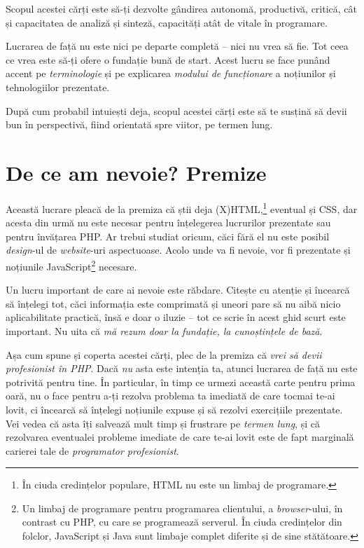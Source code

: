 Scopul acestei cărți este să-ți dezvolte gândirea autonomă, productivă,
critică, cât și capacitatea de analiză și sinteză, capacități atât de vitale
în programare.

Lucrarea de față nu este nici pe departe completă -- nici nu vrea să fie.
Tot ceea ce vrea este să-ți ofere o fundație bună de start. Acest lucru se 
face punând accent pe \textit{terminologie} și pe explicarea
\textit{modului de funcționare} a noțiunilor și tehnologiilor prezentate.

După cum probabil intuiești deja, scopul acestei cărți este să
te susțină să devii bun în perspectivă, fiind orientată spre
viitor, pe termen lung.

{}
\section*{De ce am nevoie? Premize}
Această lucrare pleacă de la premiza că știi deja (X)HTML,\footnote{În
ciuda credințelor populare, HTML nu este un limbaj de programare.} eventual și CSS, dar
acesta din urmă nu este necesar pentru înțelegerea lucrurilor prezentate
sau pentru învățarea PHP. Ar trebui
studiat oricum, căci fără el nu este posibil \textsl{design}-ul de
\textsl{website}-uri aspectuoase.
Acolo unde va fi nevoie, vor fi prezentate și noțiunile JavaScript\footnote{Un
limbaj de programare pentru programarea clientului, a \textsl{browser}-ului,
în contrast cu PHP, cu care se programează \glqq serverul\grqq.
În ciuda credințelor din folclor, JavaScript și Java sunt limbaje complet
diferite și de sine stătătoare.} necesare.

Un lucru important de care ai nevoie este răbdare. Citește cu
atenție și încearcă să înțelegi tot, căci informația este comprimată
și uneori pare să nu aibă nicio aplicabilitate practică, însă e doar o
iluzie -- tot ce scrie în acest ghid scurt este important. Nu uita că
\textit{mă rezum doar la fundație, la cunoștințele de bază}.

Așa cum spune și coperta acestei cărți, plec de la premiza că
\textit{vrei să devii profesionist în PHP}. Dacă \textit{nu} asta este intenția ta,
atunci lucrarea de față nu este potrivită pentru tine.
În particular, în timp ce urmezi această carte pentru prima oară, nu o face
pentru a-ți rezolva problema ta imediată de care tocmai te-ai lovit, ci
încearcă să înțelegi noțiunile expuse și să rezolvi exercițiile prezentate.
Vei vedea că asta îți salvează mult timp și frustrare pe \textit{termen lung},
și că rezolvarea eventualei probleme imediate de care te-ai lovit este de fapt
marginală carierei tale de \textit{programator profesionist}.

